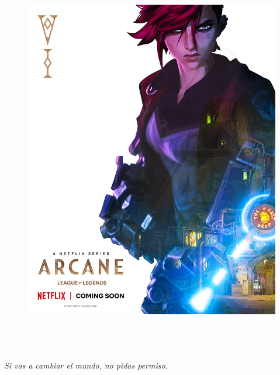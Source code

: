 \documentclass[11pt,A5]{article}
\begin{document}
\begin{figure}
    \includegraphics[scale=0.1, angle=-8]{Pelicula. Imagenes usadas/Vi, personaje menos favorito, pero que aún así es chido.jpg}
    \caption{\textcolor{white}{Perdió a todos los que amaba, pero incluso en esa situación mantiene su corazón y actitud firme, además que encuentra una nueva persona que proteger con su picante y pasional actitud}}
    \label{fig:my_label}
\end{figure}

\hspace{-2.8cm}\textit{Si vas a}\newline
\vspace{-0.1cm}
\hspace{-2.9cm}\textit{cambiar el mundo,}\newline
\vspace{-0.1cm}
\hspace{-2.9cm}\textit{no pidas permiso.}\newline
\end{document}
